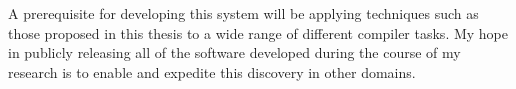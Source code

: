 A prerequisite for developing this system will be applying techniques such as those proposed in this thesis to a wide range of different compiler tasks. My hope in publicly releasing all of the software developed during the course of my research is to enable and expedite this discovery in other domains.



